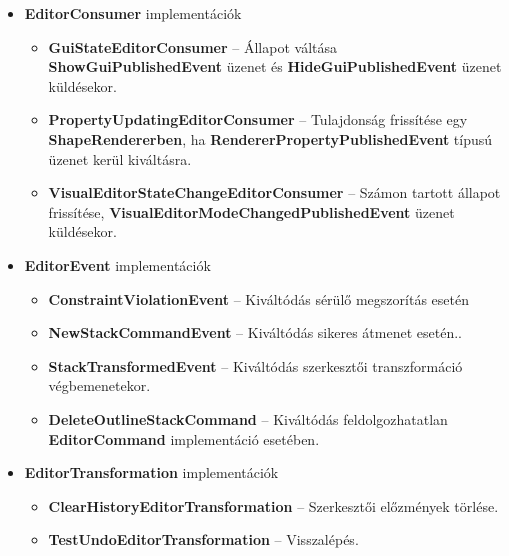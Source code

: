 \begin{itemize}
\begin{itemize}
    \end{itemize}
    \item \textbf{EditorConsumer} implementációk
    \begin{itemize}
        \item \textbf{GuiStateEditorConsumer} -- Állapot váltása \textbf{ShowGuiPublishedEvent} üzenet és \textbf{HideGuiPublishedEvent} üzenet küldésekor.
        \item \textbf{PropertyUpdatingEditorConsumer} -- Tulajdonság frissítése egy \textbf{ShapeRendererben}, ha \textbf{RendererPropertyPublishedEvent} típusú üzenet kerül kiváltásra.
        \item \textbf{VisualEditorStateChangeEditorConsumer} -- Számon tartott állapot frissítése, \textbf{VisualEditorModeChangedPublishedEvent} üzenet küldésekor.
    \end{itemize}
    \item \textbf{EditorEvent} implementációk
    \begin{itemize}
        \item \textbf{ConstraintViolationEvent} -- Kiváltódás sérülő megszorítás esetén
        \item \textbf{NewStackCommandEvent} -- Kiváltódás sikeres átmenet esetén..
        \item \textbf{StackTransformedEvent} -- Kiváltódás szerkesztői transzformáció végbemenetekor.
        \item \textbf{DeleteOutlineStackCommand} -- Kiváltódás feldolgozhatatlan \textbf{EditorCommand} implementáció esetében.
    \end{itemize}
    \item \textbf{EditorTransformation} implementációk
    \begin{itemize}
        \item \textbf{ClearHistoryEditorTransformation} -- Szerkesztői előzmények törlése.
        \item \textbf{TestUndoEditorTransformation} -- Visszalépés.
    \end{itemize}
\end{itemize}
